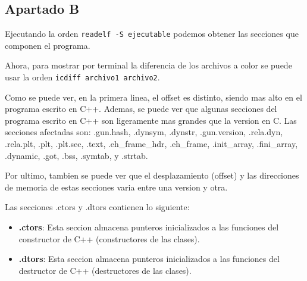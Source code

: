 \documentclass{article}
\begin{document}
\subsection*{Apartado B}

Ejecutando la orden \verb|readelf -S ejecutable| podemos obtener las secciones que componen el programa.



Ahora, para mostrar por terminal la diferencia de los archivos a color se puede usar la orden \verb|icdiff archivo1 archivo2|.


Como se puede ver, en la primera linea, el offset es distinto, siendo mas alto en el programa escrito en C++. Ademas, se puede ver que algunas secciones del programa escrito en C++ son ligeramente mas grandes que la version en C. Las secciones afectadas son: .gun.hash, .dynsym, .dynstr, .gun.version, .rela.dyn, .rela.plt, .plt, .plt.sec, .text, .eh\_frame\_hdr, .eh\_frame, .init\_array, .fini\_array, .dynamic, .got, .bss, .symtab, y .strtab.

Por ultimo, tambien se puede ver que el desplazamiento (offset) y las direcciones de memoria de estas secciones varia entre una version y otra.


\bigskip

Las secciones .ctors y .dtors contienen lo siguiente:

\begin{itemize}
    \item \textbf{.ctors}: Esta seccion almacena punteros inicializados a las funciones del constructor de C++ (constructores de las clases).
    \item \textbf{.dtors}: Esta seccion almacena punteros inicializados a las funciones del destructor de C++ (destructores de las clases).
\end{itemize}
\end{document}
